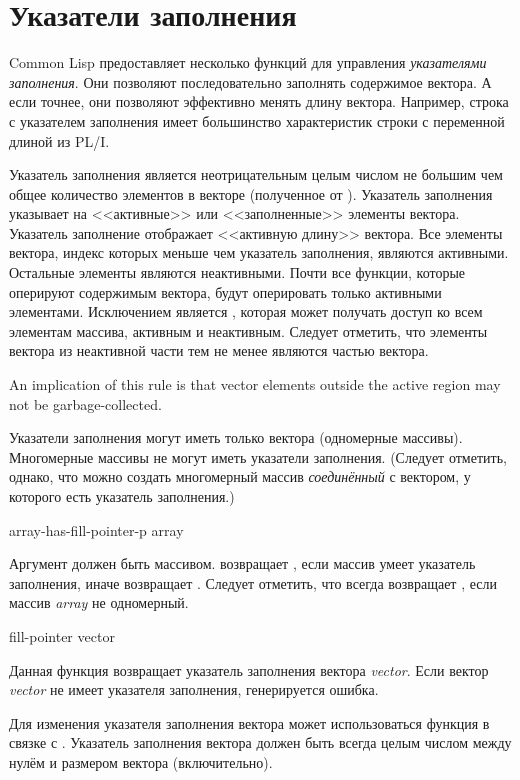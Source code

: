 \section{Указатели заполнения}
\label{FILL-POINTER}

Common Lisp предоставляет несколько функций для управления \emph{указателями
  заполнения}. Они позволяют последовательно заполнять содержимое вектора. А
если точнее, они позволяют эффективно менять длину вектора.
Например, строка с указателем заполнения имеет большинство характеристик строки
с переменной длиной из PL/I.

Указатель заполнения является неотрицательным целым числом не большим чем общее
количество элементов в векторе (полученное от ).
Указатель заполнения указывает на <<активные>> или <<заполненные>> элементы
вектора.
Указатель заполнение отображает <<активную длину>> вектора.
Все элементы вектора, индекс которых меньше чем указатель заполнения, являются
активными. Остальные элементы являются неактивными.
Почти все функции, которые оперируют содержимым вектора, будут оперировать
только активными элементами. Исключением является , которая может
получать доступ ко всем элементам массива, активным и неактивным. Следует
отметить, что элементы вектора из неактивной части тем не менее являются частью
вектора.

\beforenoterule
\begin{implementation}
An implication of this rule is that
vector elements outside the active region may not be garbage-collected.
\end{implementation}
\afternoterule

Указатели заполнения могут иметь только вектора (одномерные массивы).
Многомерные массивы не могут иметь указатели заполнения. (Следует отметить,
однако, что можно создать 
многомерный массив \emph{соединённый} с вектором, у которого есть указатель
заполнения.)

\begin{defun}[Функция]
array-has-fill-pointer-p array

Аргумент должен быть массивом.  возвращает
{\true}, если массив умеет указатель заполнения, иначе возвращает {\false}.
Следует отметить, что  всегда возвращает {\false},
если массив \emph{array} не одномерный.
\end{defun}

\begin{defun}[Функция]
fill-pointer vector

Данная функция возвращает указатель заполнения вектора \emph{vector}. Если
вектор \emph{vector} не имеет указателя заполнения, генерируется ошибка.

Для изменения указателя заполнения вектора может использоваться функция
 в связке с . Указатель заполнения вектора должен
быть всегда целым числом между нулём и размером вектора (включительно).
\end{defun}

